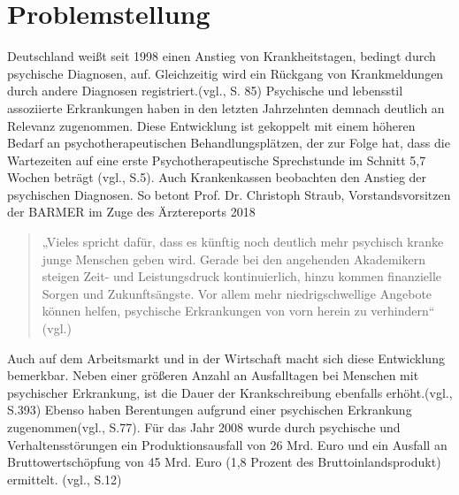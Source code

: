 
\section{Problemstellung}
\label{ch:Problemstellung}


Deutschland weißt seit 1998 einen Anstieg von Krankheitstagen, bedingt durch psychische Diagnosen, auf. Gleichzeitig wird ein Rückgang von Krankmeldungen durch andere Diagnosen registriert.(vgl.\cite{Jacobi2014}, S. 85) Psychische und lebensstil assoziierte Erkrankungen haben in den letzten Jahrzehnten demnach deutlich an Relevanz zugenommen. Diese Entwicklung ist gekoppelt mit einem höheren Bedarf an psychotherapeutischen Behandlungsplätzen, der zur Folge hat, dass die Wartezeiten auf eine erste Psychotherapeutische Sprechstunde im Schnitt 5,7 Wochen beträgt (vgl.\cite{Microsof77:online}, S.5). Auch Krankenkassen beobachten den Anstieg der psychischen Diagnosen. So betont Prof. Dr. Christoph Straub, Vorstandsvorsitzen der BARMER im Zuge des Ärztereports 2018 
\begin{quote}
„Vieles spricht dafür, dass es künftig noch deutlich mehr psychisch kranke junge Menschen geben wird. Gerade bei den angehenden Akademikern steigen Zeit- und Leistungsdruck kontinuierlich, hinzu kommen finanzielle Sorgen und Zukunftsängste. Vor allem mehr niedrigschwellige Angebote können helfen, psychische Erkrankungen von vorn herein zu verhindern“ (vgl.\cite{Arztrepo90:online})
\end{quote}
Auch auf dem Arbeitsmarkt und in der Wirtschaft macht sich diese Entwicklung bemerkbar. Neben einer größeren Anzahl an Ausfalltagen bei Menschen mit psychischer Erkrankung, ist die Dauer der Krankschreibung ebenfalls erhöht.(vgl.\cite{Nubling2014}, S.393) Ebenso haben Berentungen aufgrund einer psychischen Erkrankung zugenommen(vgl.\cite{Jacobi2014}\cite{Nubling2014}, S.77). Für das Jahr 2008 wurde durch psychische und Verhaltensstörungen ein Produktionsausfall von 26 Mrd. Euro und ein Ausfall an Bruttowertschöpfung von 45 Mrd. Euro (1,8 Prozent des Bruttoinlandsprodukt) ermittelt. (vgl.\cite{EntwurfeinesDreizehntenGesetzeszurAnderungdesAtomgesetzesBundesregierungDeutschland2012}, S.12)


